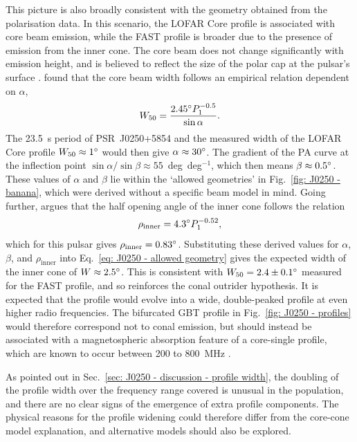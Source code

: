 This picture is also broadly consistent with the geometry obtained from the polarisation data. In this scenario, the LOFAR Core profile is associated with core beam emission, while the FAST profile is broader due to the presence of emission from the inner cone. The core beam does not change significantly with emission height, and is believed to reflect the size of the polar cap at the pulsar's surface \citep{Rxxx1983a}. \citet{Rxxx1990} found that the core beam width follows an empirical relation dependent on $\alpha$,
\begin{equation}
    \label{eq: J0250 - core beam W50}
    W_{50} =\frac{2.45^\circ P_1^{-0.5}}{\sin\alpha}.
\end{equation}
The 23.5~s period of PSR~J0250+5854 and the measured width of the LOFAR Core profile $W_{50} \approx 1^\circ$ would then give $\alpha \approx 30^\circ$. The gradient of the PA curve at the inflection point $\sin\alpha/\sin\beta \approx 55$~deg~deg$^{-1}$, which then means $\beta \approx 0.5^\circ$. These values of $\alpha$ and $\beta$ lie within the `allowed geometries' in Fig.~\ref{fig: J0250 - banana}, which were derived without a specific beam model in mind. Going further, \citet{Rxxx1993} argues that the half opening angle of the inner cone follows the relation
\begin{equation}
    \label{eq: J0250 - inner cone rho}
    \rho_\mathrm{inner} = 4.3^\circ P_1^{-0.52},
\end{equation}
which for this pulsar gives $\rho_\mathrm{inner} = 0.83^\circ$. Substituting these derived values for $\alpha$, $\beta$, and $\rho_\mathrm{inner}$ into Eq.~\eqref{eq: J0250 - allowed geometry} gives the expected width of the inner cone of $W \approx 2.5^\circ$. This is consistent with $W_{50} = 2.4\pm 0.1^\circ$ measured for the FAST profile, and so reinforces the conal outrider hypothesis. It is expected that the profile would evolve into a wide, double-peaked profile at even higher radio frequencies. The bifurcated GBT profile in Fig.~\ref{fig: J0250 - profiles} would therefore correspond not to conal emission, but should instead be associated with a magnetospheric absorption feature of a core-single profile, which are known to occur between 200 to 800~MHz \citep[e.g.][]{Rxxx1983b, Rxxx1986}. 

As pointed out in Sec.~\ref{sec: J0250 - discussion - profile width}, the doubling of the profile width over the frequency range covered is unusual in the population, and there are no clear signs of the emergence of extra profile components. The physical reasons for the profile widening could therefore differ from the core-cone model explanation, and alternative models should also be explored.

